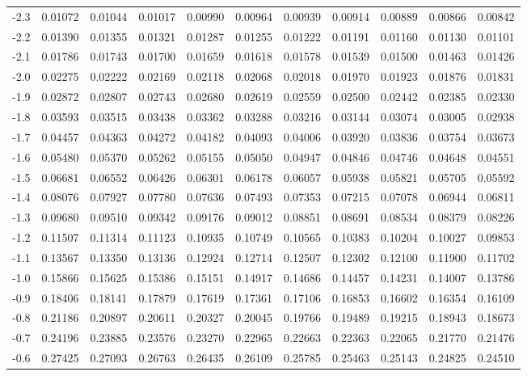 \documentclass{article}
\begin{document}
\begin{center}
\begin{tabularx}{\linewidth}{*{11}{Y}}
-2.3 & 0.01072 & 0.01044 & 0.01017 & 0.00990 & 0.00964 & 0.00939 & 0.00914 & 0.00889 & 0.00866 & 0.00842\\
-2.2 & 0.01390 & 0.01355 & 0.01321 & 0.01287 & 0.01255 & 0.01222 & 0.01191 & 0.01160 & 0.01130 & 0.01101\\
-2.1 & 0.01786 & 0.01743 & 0.01700 & 0.01659 & 0.01618 & 0.01578 & 0.01539 & 0.01500 & 0.01463 & 0.01426\\
-2.0 & 0.02275 & 0.02222 & 0.02169 & 0.02118 & 0.02068 & 0.02018 & 0.01970 & 0.01923 & 0.01876 & 0.01831\\
-1.9 & 0.02872 & 0.02807 & 0.02743 & 0.02680 & 0.02619 & 0.02559 & 0.02500 & 0.02442 & 0.02385 & 0.02330\\
-1.8 & 0.03593 & 0.03515 & 0.03438 & 0.03362 & 0.03288 & 0.03216 & 0.03144 & 0.03074 & 0.03005 & 0.02938\\
-1.7 & 0.04457 & 0.04363 & 0.04272 & 0.04182 & 0.04093 & 0.04006 & 0.03920 & 0.03836 & 0.03754 & 0.03673\\
-1.6 & 0.05480 & 0.05370 & 0.05262 & 0.05155 & 0.05050 & 0.04947 & 0.04846 & 0.04746 & 0.04648 & 0.04551\\
-1.5 & 0.06681 & 0.06552 & 0.06426 & 0.06301 & 0.06178 & 0.06057 & 0.05938 & 0.05821 & 0.05705 & 0.05592\\
-1.4 & 0.08076 & 0.07927 & 0.07780 & 0.07636 & 0.07493 & 0.07353 & 0.07215 & 0.07078 & 0.06944 & 0.06811\\
-1.3 & 0.09680 & 0.09510 & 0.09342 & 0.09176 & 0.09012 & 0.08851 & 0.08691 & 0.08534 & 0.08379 & 0.08226\\
-1.2 & 0.11507 & 0.11314 & 0.11123 & 0.10935 & 0.10749 & 0.10565 & 0.10383 & 0.10204 & 0.10027 & 0.09853\\
-1.1 & 0.13567 & 0.13350 & 0.13136 & 0.12924 & 0.12714 & 0.12507 & 0.12302 & 0.12100 & 0.11900 & 0.11702\\
-1.0 & 0.15866 & 0.15625 & 0.15386 & 0.15151 & 0.14917 & 0.14686 & 0.14457 & 0.14231 & 0.14007 & 0.13786\\
-0.9 & 0.18406 & 0.18141 & 0.17879 & 0.17619 & 0.17361 & 0.17106 & 0.16853 & 0.16602 & 0.16354 & 0.16109\\
-0.8 & 0.21186 & 0.20897 & 0.20611 & 0.20327 & 0.20045 & 0.19766 & 0.19489 & 0.19215 & 0.18943 & 0.18673\\
-0.7 & 0.24196 & 0.23885 & 0.23576 & 0.23270 & 0.22965 & 0.22663 & 0.22363 & 0.22065 & 0.21770 & 0.21476\\
-0.6 & 0.27425 & 0.27093 & 0.26763 & 0.26435 & 0.26109 & 0.25785 & 0.25463 & 0.25143 & 0.24825 & 0.24510\\

\end{tabularx}
\end{center}
\end{document}

